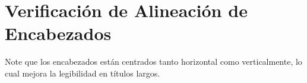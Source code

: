 \documentclass{sener2025}
\begin{document}
\section{Verificación de Alineación de Encabezados}

Note que los encabezados están centrados tanto horizontal como verticalmente, lo cual mejora la legibilidad en títulos largos.
\end{document}
